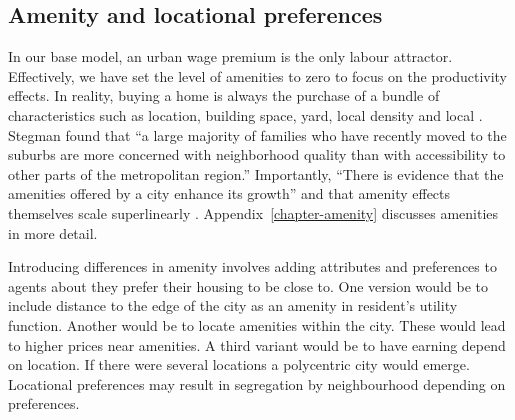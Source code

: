 

\subsection{Amenity and locational preferences}
In our base model, an urban wage premium is the only labour attractor. Effectively, we have set the level of amenities to zero to focus on the productivity effects. In reality, buying a home is always the purchase of a bundle of characteristics such as location, building space, yard, local density and local . Stegman found that ``a large majority of families who have recently moved to the suburbs are more concerned with neighborhood quality than with accessibility to other parts of the metropolitan region.'' Importantly, 
``There is evidence that the amenities offered by a city enhance its growth'' \cite{clarkAmenitiesDriveUrban2002, falckPhantomOperaCultural2011} and that amenity effects themselves scale superlinearly \cite{kraemerCulturalSustainabilityUS2022}.
Appendix~\ref{chapter-amenity} discusses amenities in more detail. 

Introducing differences in amenity involves adding attributes and preferences to agents about they prefer their housing to be close to.  One version would be to include distance to the edge of the city as an amenity in resident's utility function. Another would be to locate amenities within the city. These would lead to higher prices near amenities. A third variant would be to have earning depend on location. If there were several locations a polycentric city would emerge. Locational preferences may result in segregation by neighbourhood depending on preferences.



